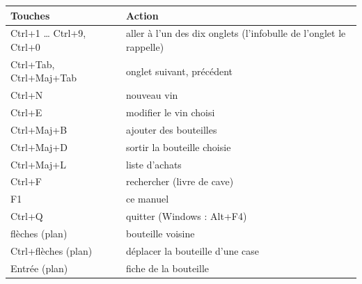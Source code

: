 \documentclass[11pt,a4paper]{article}
\begin{document}
\begin{center}
\begin{tabular}{>{\sffamily}l l}
\toprule
\textbf{Touches} & \textbf{Action} \\
\midrule
Ctrl+1 … Ctrl+9, Ctrl+0 & aller à l'un des dix onglets (l'infobulle de l'onglet le rappelle) \\
Ctrl+Tab, Ctrl+Maj+Tab & onglet suivant, précédent \\
Ctrl+N & nouveau vin \\
Ctrl+E & modifier le vin choisi \\
Ctrl+Maj+B & ajouter des bouteilles \\
Ctrl+Maj+D & sortir la bouteille choisie \\
Ctrl+Maj+L & liste d'achats \\
Ctrl+F & rechercher (livre de cave) \\
F1 & ce manuel \\
Ctrl+Q & quitter (Windows : Alt+F4) \\
\midrule
flèches (plan) & bouteille voisine \\
Ctrl+flèches (plan) & déplacer la bouteille d'une case \\
Entrée (plan) & fiche de la bouteille \\
\bottomrule
\end{tabular}
\end{center}

\end{document}
